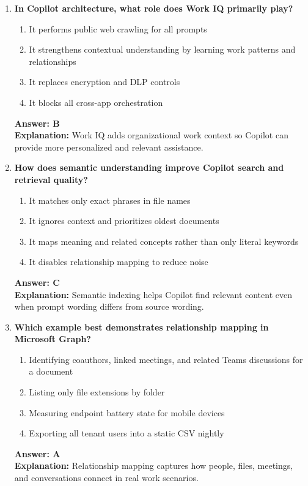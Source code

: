 \documentclass[10pt]{article}
\begin{document}
\begin{enumerate}[leftmargin=*]
\item \textbf{In Copilot architecture, what role does Work IQ primarily play?}
\begin{enumerate}[label=\Alph*.]
  \item It performs public web crawling for all prompts
  \item It strengthens contextual understanding by learning work patterns and relationships
  \item It replaces encryption and DLP controls
  \item It blocks all cross-app orchestration
\end{enumerate}
\textbf{Answer: B}\\
\textbf{Explanation:} Work IQ adds organizational work context so Copilot can provide more personalized and relevant assistance.

\item \textbf{How does semantic understanding improve Copilot search and retrieval quality?}
\begin{enumerate}[label=\Alph*.]
  \item It matches only exact phrases in file names
  \item It ignores context and prioritizes oldest documents
  \item It maps meaning and related concepts rather than only literal keywords
  \item It disables relationship mapping to reduce noise
\end{enumerate}
\textbf{Answer: C}\\
\textbf{Explanation:} Semantic indexing helps Copilot find relevant content even when prompt wording differs from source wording.

\item \textbf{Which example best demonstrates relationship mapping in Microsoft Graph?}
\begin{enumerate}[label=\Alph*.]
  \item Identifying coauthors, linked meetings, and related Teams discussions for a document
  \item Listing only file extensions by folder
  \item Measuring endpoint battery state for mobile devices
  \item Exporting all tenant users into a static CSV nightly
\end{enumerate}
\textbf{Answer: A}\\
\textbf{Explanation:} Relationship mapping captures how people, files, meetings, and conversations connect in real work scenarios.


\end{enumerate}
\end{document}
